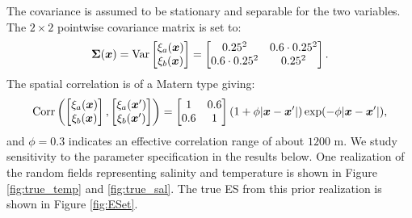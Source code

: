 \documentclass[aoas]{imsart}
\newcommand{\kcomment}[1]{{\color{red}{\{KR: #1\}}}}
\newcommand{\kc}{\kcomment}
\begin{document}
The covariance is assumed to be stationary and separable for the two variables. 
The $2 \times 2$ pointwise covariance matrix is set to:
\begin{equation}\label{v0}
\bSigma(\bx)=\mbox{Var} 
\begin{bmatrix}
    \xi_a(\bx) \\
    \xi_b(\bx) 
    \end{bmatrix}=
\begin{bmatrix}
0.25^2 & 0.6 \cdot 0.25^2 \\
0.6 \cdot 0.25^2 & 0.25^2
\end{bmatrix}.
\end{equation}
The spatial correlation is of a Matern type \kc{? Define or cite} giving:
\begin{equation}\label{v}
\mbox{Corr} 
\left(
\begin{bmatrix}
    \xi_a(\bx) \\
    \xi_b(\bx) 
    \end{bmatrix},
    \begin{bmatrix}
    \xi_a(\bx') \\
    \xi_b(\bx') 
    \end{bmatrix}
    \right)
    = \begin{bmatrix}
1 & 0.6  \\
0.6  & 1
\end{bmatrix}(1+\phi |\bx-\bx'|)\exp (-\phi |\bx-\bx'|),
\end{equation}
and $\phi=0.3$ indicates an effective correlation range of about $1200$ m. 
We study sensitivity to the parameter specification in the results
below.  One realization of the random fields representing salinity and
temperature is shown in Figure \ref{fig:true_temp} and
\ref{fig:true_sal}. The true ES from this prior realization is shown
in Figure \ref{fig:ESet}.
\end{document}
